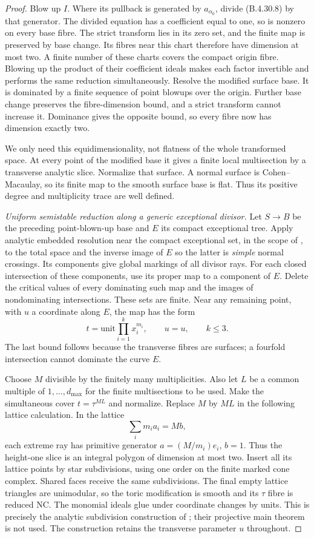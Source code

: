 \begin{proof}
Blow up $I$. Where its pullback is generated
by $a_{\alpha_0}$, divide (B.4.30.8) by that
generator. The divided equation has a
coefficient equal to one, so is nonzero on
every base fibre. The strict transform lies
in its zero set, and the finite map is
preserved by base change. Its fibres near
this chart therefore have dimension at most
two. A finite number of these charts covers
the compact origin fibre. Blowing up the
product of their coefficient ideals makes
each factor invertible and performs the same
reduction simultaneously. Resolve the
modified surface base. It is dominated by a
finite sequence of point blowups over the
origin. Further base change preserves the
fibre-dimension bound, and a strict transform
cannot increase it. Dominance gives the
opposite bound, so every fibre now has
dimension exactly two.

We only need this equidimensionality, not
flatness of the whole transformed space.
At every point of the modified base it gives
a finite local multisection by a transverse
analytic slice. Normalize that surface. A
normal surface is Cohen--Macaulay, so its
finite map to the smooth surface base is
flat. Thus its positive degree and
multiplicity trace are well defined.

\emph{Uniform semistable reduction along a generic exceptional divisor.}
Let $S\to B$ be the preceding point-blown-up
base and $E$ its compact exceptional tree.
Apply analytic embedded resolution near
the compact exceptional set, in the scope of
\citet[Theorems 1.6 and 1.10]{BM95AB}, to
the total space and the inverse image of $E$
so the latter is \emph{simple} normal crossings. Its components give global
markings of all divisor rays. For each closed
intersection of these components, use its
proper map to a component of $E$. Delete the
critical values of every dominating such map
and the images of nondominating intersections.
These sets are finite. Near any remaining
point, with $u$ a coordinate along $E$, the
map has the form
\[
 t=\text{unit}\prod_{i=1}^k x_i^{m_i},
 \qquad u=u,\qquad k\le3.
 \tag{B.4.30.9}
\]
The last bound follows because the transverse
fibres are surfaces; a fourfold intersection
cannot dominate the curve $E$.

Choose $M$ divisible by the finitely many
multiplicities. Also let $L$ be a common
multiple of $1,\ldots,d_{\max}$ for the
finite multisections to be used. Make the
simultaneous cover $t=\tau^{ML}$ and
normalize. Replace $M$ by $ML$ in the
following lattice calculation. In the lattice
\[
 \sum_i m_i a_i=M b,
\]
each extreme ray has primitive generator
$a=(M/m_i)e_i$, $b=1$. Thus the height-one
slice is an integral polygon of dimension
at most two. Insert all its lattice points
by star subdivisions, using one order on the
finite marked cone complex. Shared faces
receive the same subdivisions. The final
empty lattice triangles are unimodular, so
the toric modification is smooth and its
$\tau$ fibre is reduced NC. The monomial
ideals glue under coordinate changes by
units. This is precisely the analytic
subdivision construction of
\citet[Lemma 2.14, pp.~6--7]{EH2024E}; their
projective main theorem is not used.
The construction retains the transverse
parameter $u$ throughout.


\end{proof}
